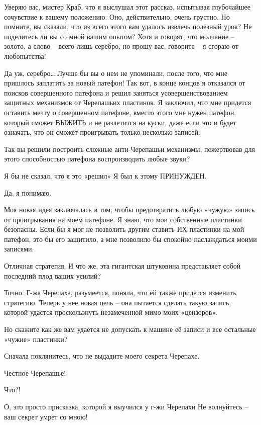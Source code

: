 \documentclass[../main.tex]{subfiles}
\begin{document}
\begin{dialogue}
 Уверяю вас, мистер Краб, что я выслушал этот рассказ, испытывая глубочайшее сочувствие к вашему положению. Оно, действительно, очень грустно. Но помните, вы сказали, что из всего этого вам удалось извлечь полезный урок? Не поделитесь ли вы со мной вашим опытом? Хотя и говорят, что молчание \--- золото, а слово \--- всего лишь серебро, но прошу вас, говорите \--- я сгораю от любопытства!

 Да уж, серебро\ldots{} Лучше бы вы о нем не упоминали, после того, что мне пришлось заплатить за новый патефон! Так вот, в конце концов я отказался от поисков совершенного патефона и решил заняться усовершенствованием защитных механизмов от Черепашьих пластинок. Я заключил, что мне придется оставить мечту о совершенном патефоне, вместо этого мне нужен патефон, который сможет ВЫЖИТЬ и не разлетится на куски, даже если это и будет означать, что он сможет проигрывать только несколько записей.

 Так вы решили построить сложные анти-Черепашьи механизмы, пожертвовав для этого способностью патефона воспроизводить любые звуки?

 Я бы не сказал, что я это «решил» Я был к этому ПРИНУЖДЕН.

 Да, я понимаю.

 Моя новая идея заключалась в том, чтобы предотвратить любую «чужую» запись от проигрывания на моем патефоне. Я знаю, что мои собственные пластинки безопасны. Если бы я мог не позволить другим ставить ИХ пластинки на мой патефон, это бы его защитило, а мне позволило бы спокойно наслаждаться моими записями.

 Отличная стратегия. И что же, эта гигантская штуковина представляет собой последний плод ваших усилий?

 Точно. Г-жа Черепаха, разумеется, поняла, что ей также придется изменить стратегию. Теперь у нее новая цель \--- она пытается сделать такую запись, которой удастся проскользнуть незамеченной мимо моих «цензоров».

 Но скажите как же вам удается не допускать к машине её записи и все остальные «чужие» пластинки?

 Сначала поклянитесь, что не выдадите моего секрета Черепахе.

 Честное Черепашье!

 Что?!

 О, это просто присказка, которой я выучился у г-жи Черепахи Не волнуйтесь \--- ваш секрет умрет со мною!


\end{dialogue}
\end{document}
